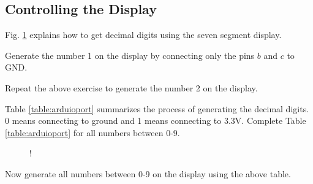 \subsection{Controlling the Display}
Fig. \ref{fig:sevenseg12} explains how to get decimal digits using the seven segment display. 
\begin{problem}
	Generate the number 1 on the display by connecting only the pins $b$ and $c$ to GND. 
\end{problem}	
\begin{problem}
	Repeat the above exercise to generate the number 2 on the display.
\end{problem}	
%
\begin{problem}
Table \ref{table:arduioport} summarizes the process of generating the decimal digits.  0 means connecting to ground and 1 means connecting to 3.3V.  	Complete Table \ref{table:arduioport} for all numbers between 0-9.
\end{problem}	

%
%
\begin{figure}[!h]
\begin{center}
 {!} {

}
\end{center}
\caption{}
\label{fig:sevenseg12}
\end{figure}
%
\begin{problem}
	Now generate all numbers between  0-9 on the display using the above table.
\end{problem}
%
%
